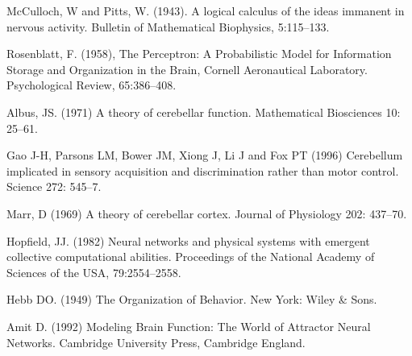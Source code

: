 \documentclass[12pt]{article}
\begin{document}
\begin{thebibliography}{10}

McCulloch, W and Pitts, W. (1943). A logical calculus of the ideas immanent in nervous activity. 
\newblock Bulletin of Mathematical Biophysics, 5:115--133. 

Rosenblatt, F. (1958), The Perceptron: A Probabilistic Model for Information Storage and Organization in the Brain, Cornell Aeronautical Laboratory.
\newblock Psychological Review, 65:386--408.

Albus, JS. (1971) A theory of cerebellar function. 
\newblock Mathematical Biosciences 10: 25--61.


Gao J-H, Parsons LM, Bower JM, Xiong J, Li J and Fox PT (1996) Cerebellum implicated in sensory acquisition and discrimination rather than motor control.
\newblock Science 272: 545--7. 

Marr, D (1969) A theory of cerebellar cortex.
\newblock Journal of Physiology 202: 437--70.

Hopfield, JJ. (1982) Neural networks and physical systems with emergent collective computational abilities.
\newblock Proceedings of the National Academy of Sciences of the USA, 79:2554--2558.

Hebb DO. (1949) The Organization of Behavior. 
\newblock New York: Wiley \& Sons.


 Amit D. (1992) Modeling Brain Function: The World
  of Attractor Neural Networks.
\newblock Cambridge University Press, Cambridge England.


\end{thebibliography}
\end{document}
